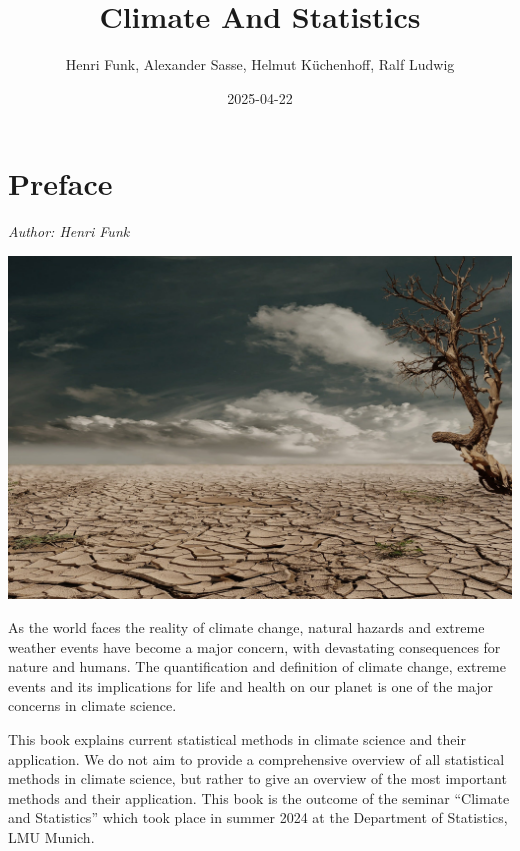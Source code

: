 \documentclass[
]{krantz}
\title{Climate And Statistics}
\author{Henri Funk, Alexander Sasse, Helmut Küchenhoff, Ralf Ludwig}
\date{2025-04-22}
\begin{document}
\maketitle


\thispagestyle{empty}

\begin{center}
\end{center}

\setlength{\abovedisplayskip}{-5pt}
\setlength{\abovedisplayshortskip}{-5pt}

{
\hypersetup{linkcolor=}
\setcounter{tocdepth}{0}
\tableofcontents
}
\chapter*{Preface}\label{preface}


\emph{Author: Henri Funk}

\begin{center}\includegraphics[width=0.75\linewidth]{cover} \end{center}

As the world faces the reality of climate change, natural hazards and extreme weather events have become a major concern, with devastating consequences for nature and humans. The quantification and definition of climate change, extreme events and its implications for life and health on our planet is one of the major concerns in climate science.

This book explains current statistical methods in climate science and their application.
We do not aim to provide a comprehensive overview of all statistical methods in climate science, but rather to give an overview of the most important methods and their application.
This book is the outcome of the seminar ``Climate and Statistics'' which took place in summer 2024 at the Department of Statistics, LMU Munich.
\end{document}
